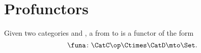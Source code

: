 

\section{Profunctors}

\begin{ctdefinition}[Profunctor]
  \label{def:profunctor}
  Given two categories \CatC and \CatD, a \emph{} from \CatC to \CatD is a functor of the form
  \begin{equation}
    \funa\colon \CatC\op \Ctimes \CatD \mto \Set.
  \end{equation}
\end{ctdefinition}

